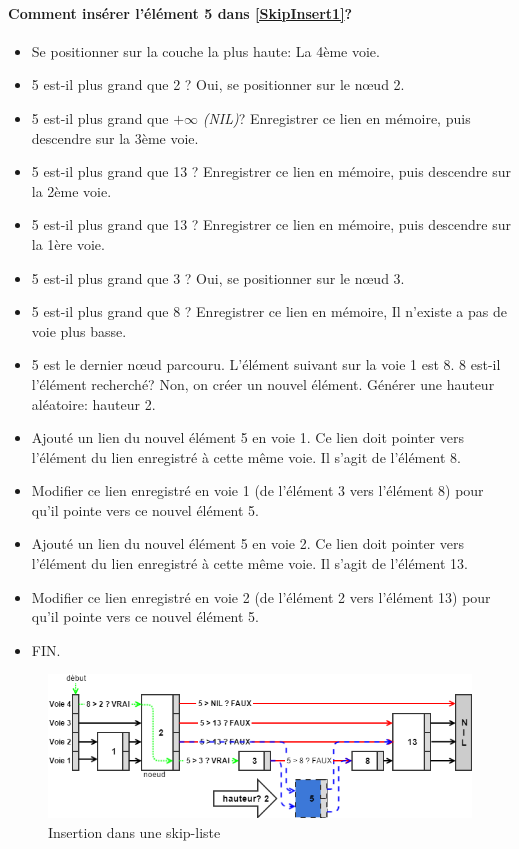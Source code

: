 \documentclass[hidelinks,a4paper, 12pt]{article}
\begin{document}
	\newpage
	\paragraph*{Comment insérer l'élément 5 dans \cref{SkipInsert1}?}
	\begin{itemize}
		\item Se positionner sur la couche la plus haute: La 4ème voie.
		\item 5 est-il plus grand que 2 ? Oui, se positionner sur le nœud 2.
		\item 5 est-il plus grand que $+\infty$ \textit{(NIL)}? Enregistrer ce lien en mémoire, puis descendre sur la 3ème voie.
		\item 5 est-il plus grand que 13 ? Enregistrer ce lien en mémoire, puis descendre sur la 2ème voie.
		\item 5 est-il plus grand que 13 ? Enregistrer ce lien en mémoire, puis descendre sur la 1ère voie.
		\item 5 est-il plus grand que 3 ? Oui, se positionner sur le nœud 3.
		\item 5 est-il plus grand que 8 ? Enregistrer ce lien en mémoire, Il n'existe a pas de voie plus basse.
		\item 5 est le dernier nœud parcouru. L'élément suivant sur la voie 1 est 8. 8 est-il l'élément recherché? Non, on créer un nouvel élément. Générer une hauteur aléatoire: hauteur 2.
		\item Ajouté un lien du nouvel élément 5 en voie 1. Ce lien doit pointer vers l'élément du lien enregistré à cette même voie. Il s'agit de l'élément 8.
		\item Modifier ce lien enregistré en voie 1 (de l'élément 3 vers l'élément 8) pour qu'il pointe vers ce nouvel élément 5.
		\item Ajouté un lien du nouvel élément 5 en voie 2. Ce lien doit pointer vers l'élément du lien enregistré à cette même voie. Il s'agit de l'élément 13.
		\item Modifier ce lien enregistré en voie 2 (de l'élément 2 vers l'élément 13) pour qu'il pointe vers ce nouvel élément 5.
		\item FIN.
	\end{itemize}
	\begin{figure}[h]
		\includegraphics[width=\textwidth]{img/insert2}
		\caption{Insertion dans une skip-liste}
		\label{SkipInsert2}
	\end{figure}
	
\end{document}
